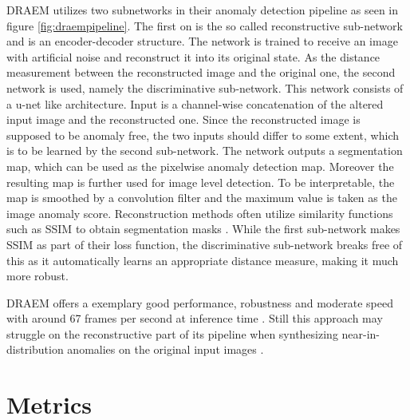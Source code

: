 DRAEM utilizes two subnetworks in their anomaly detection pipeline as seen in figure \ref{fig:draempipeline}. The first on is the so called reconstructive sub-network and is an encoder-decoder structure. The network is trained 
to receive an image with artificial noise and reconstruct it into its original state. As the distance measurement between the reconstructed image and the original one, the second network is used, 
namely the discriminative sub-network. This network consists of a u-net \cite{Ronneberger_2015UNET} like architecture. Input is a channel-wise concatenation of the altered input image and the reconstructed 
one. Since the reconstructed image is supposed to be anomaly free, the two inputs should differ to some extent, which is to be learned by the second sub-network. The network outputs a segmentation map, 
which can be used as the pixelwise anomaly detection map. Moreover the resulting map is further used for image level detection. To be interpretable, the map is smoothed by a convolution filter 
and the maximum value is taken as the image anomaly score. Reconstruction methods often utilize similarity functions such as SSIM \cite{Wang_2004SSIM} to obtain segmentation masks \cite{Zavrtanik_2021DRAEM} 
\cite{liu2024deep}. While the first 
sub-network makes SSIM as part of their loss function, the discriminative sub-network breaks free of this as it automatically learns an appropriate distance measure, making it much more robust.

DRAEM offers a exemplary good performance, robustness and moderate speed with around 67 frames per second at inference time \cite{liu2023simplenet}. Still this approach may struggle on the reconstructive 
part of its pipeline when synthesizing near-in-distribution anomalies on the original input images \cite{liu2024deep}. %










\section{Metrics}
\label{sec:metrics}

